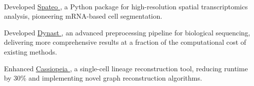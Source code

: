 \documentclass[]{resume}
\begin{document}
\begin{minipage}[t]{0.69\textwidth}
\\
\begin{tightemize}
    \item{Developed \href{https://github.com/aristoteleo/spateo-release}{Spateo \faGithub}, a Python package for high-resolution spatial transcriptomics analysis, pioneering mRNA-based cell segmentation.}
    \item{Developed \href{https://github.com/aristoteleo/dynast-release}{Dynast \faGithub}, an advanced preprocessing pipeline for biological sequencing, delivering more comprehensive results at a fraction of the computational cost of existing methods.}
    \item{Enhanced \href{https://github.com/YosefLab/Cassiopeia}{Cassiopeia \faGithub}, a single-cell lineage reconstruction tool, reducing runtime by 30\% and implementing novel graph reconstruction algorithms.}
\end{tightemize}






\end{minipage}
\end{document}
